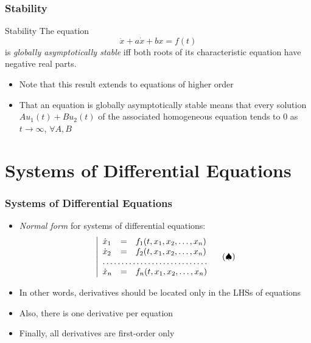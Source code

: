 \documentclass[10pt,usenames,dvipsnames]{beamer}
\theoremstyle{definition}
\begin{document}
\begin{frame}[fragile]
\frametitle{Stability}
\begin{block}{Stability}
	The equation
	\[
		\ddot{x} + a\dot{x} + bx = f(t)
	\]
	is \textit{globally asymptotically stable} iff both roots of its characteristic equation have negative real parts.
\end{block}
\begin{itemize}
	\item Note that this result extends to equations of higher order
	\item That an equation is globally asymptotically stable means that every solution $Au_{1}(t) + Bu_{2}(t)$ of the associated homogeneous equation tends to 0 as $t\to\infty$, $\forall A,B$
\end{itemize}
\end{frame}

\section{Systems of Differential Equations}
\begin{frame}[fragile]
	\frametitle{Systems of Differential Equations}
	\begin{itemize}
		\item \textit{Normal form} for systems of differential equations:
		\[
			\left|
			\begin{array}{lcl}
				\dot{x}_{1} & = & f_{1}(t, x_{1}, x_{2},\ldots,x_{n})\\
				\dot{x}_{2} & = & f_{2}(t, x_{1}, x_{2},\ldots,x_{n})\\
				\hdotsfor{3}\\
				\dot{x}_{n} & = & f_{n}(t, x_{1}, x_{2},\ldots,x_{n})\\
			\end{array}\right. \quad (\spadesuit)
		\]
		
		\item In other words, derivatives should be located only in the LHSs of equations
		
		\item Also, there is one derivative per equation
		
		\item Finally, all derivatives are first-order only
	\end{itemize}
\end{frame}
\end{document}
